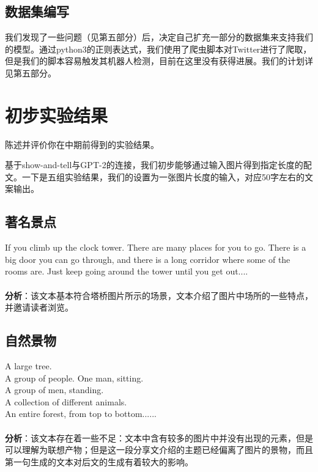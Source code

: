 \documentclass{article}
\begin{document}
\begin{CJK*}{UTF8}{gbsn}
\subsection{数据集编写}
我们发现了一些问题（见第五部分）后，决定自己扩充一部分的数据集来支持我们的模型。通过python3的正则表达式，我们使用了爬虫脚本对Twitter进行了爬取，但是我们的脚本容易触发其机器人检测，目前在这里没有获得进展。我们的计划详见第五部分。

\section{初步实验结果}

陈述并评价你在中期前得到的实验结果。

基于show-and-tell与GPT-2的连接，我们初步能够通过输入图片得到指定长度的配文。一下是五组实验结果，我们的设置为一张图片长度的输入，对应50字左右的文案输出。

\subsection{著名景点}


If you climb up the clock tower. There are many places for you to go. There is a big door you can go through, and there is a long corridor where some of the rooms are. Just keep going around the tower until you get out.... \\
\\
\textbf{分析}：该文本基本符合塔桥图片所示的场景，文本介绍了图片中场所的一些特点，并邀请读者浏览。

\subsection{自然景物}


A large tree. \\

A group of people. One man, sitting. \\

A group of men, standing. \\

A collection of different animals. \\ 

An entire forest, from top to bottom...... \\
\\
\textbf{分析}：该文本存在着一些不足：文本中含有较多的图片中并没有出现的元素，但是可以理解为联想产物；但是这一段分享文介绍的主题已经偏离了图片的景物，而且第一句生成的文本对后文的生成有着较大的影响。


\end{CJK*}
\end{document}
